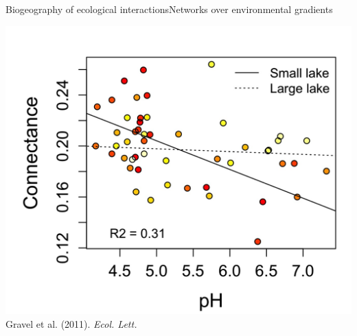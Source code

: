 \documentclass{eecslides}
\begin{document}



	\begin{frame}{Biogeography of ecological interactions}{Networks over environmental gradients}
		\begin{center}
			\includegraphics[height=0.6\textheight]{havens_ph}\\
			\footnotesize{Gravel et al. (2011). \textit{Ecol. Lett.}}
		\end{center}   
	\end{frame}

\end{document}
